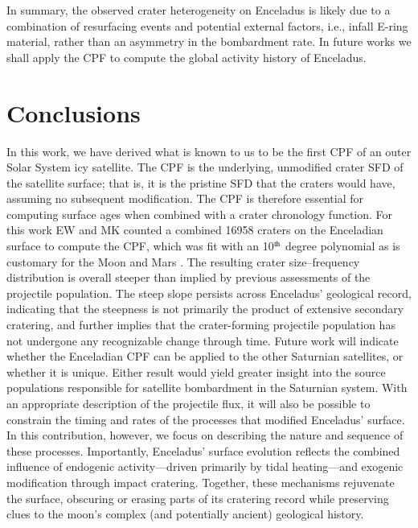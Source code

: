 \documentclass[preprint,11pt,3p,times,authoryear]{elsarticle}
\begin{document}
{In summary, the observed crater heterogeneity on Enceladus is likely due to a combination of resurfacing events and potential external factors, i.e., infall E-ring material, rather than an asymmetry in the bombardment rate. In future works we shall apply the CPF to compute the global activity history of Enceladus.

\section{Conclusions}
\label{sect:conclusion}
In this work, we have derived what is known to us to be the first CPF of an outer Solar System icy satellite. The CPF is the underlying, unmodified crater SFD of the satellite surface; that is, it is the pristine SFD that the craters would have, assuming no subsequent modification. The CPF is therefore essential for computing surface ages when combined with a crater chronology function.
For this work EW and MK counted a combined 16958 craters on the Enceladian surface to compute the CPF, which was fit with an 10$^{\rm th}$ degree polynomial as is customary for the Moon and Mars \citep{Neukum1975, Neukum2001,Ivanov2001}.
The resulting crater size–frequency distribution is overall steeper than implied by previous assessments of the projectile population. The steep slope persists across Enceladus’ geological record, indicating that the steepness is not primarily the product of extensive secondary cratering, and further implies that the crater-forming projectile population has not undergone any recognizable change through time.
Future work will indicate whether the Enceladian CPF can be applied to the other Saturnian satellites, or whether it is unique. Either result would yield greater insight into the source populations responsible for satellite bombardment in the Saturnian system.
With an appropriate description of the projectile flux, it will also be possible to constrain the timing and rates of the processes that modified Enceladus’ surface. In this contribution, however, we focus on describing the nature and sequence of these processes. Importantly, Enceladus’ surface evolution reflects the combined influence of endogenic activity—driven primarily by tidal heating—and exogenic modification through impact cratering.
Together, these mechanisms rejuvenate the surface, obscuring or erasing parts of its cratering record while preserving clues to the moon’s complex (and potentially ancient) geological history.


}
\end{document}
